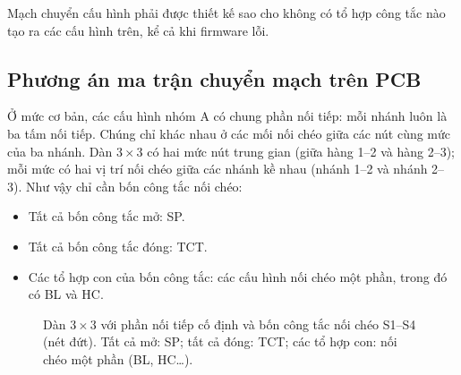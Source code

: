 Mạch chuyển cấu hình phải được thiết kế sao cho không có tổ hợp công tắc nào tạo ra các cấu hình trên, kể cả khi firmware lỗi.

\subsection{Phương án ma trận chuyển mạch trên PCB}
\label{sec:pcb}

Ở mức cơ bản, các cấu hình nhóm A có chung phần nối tiếp: mỗi nhánh luôn là ba tấm nối tiếp. Chúng chỉ khác nhau ở các mối nối chéo giữa các nút cùng mức của ba nhánh. Dàn \(3\times3\) có hai mức nút trung gian (giữa hàng 1--2 và hàng 2--3); mỗi mức có hai vị trí nối chéo giữa các nhánh kề nhau (nhánh 1--2 và nhánh 2--3). Như vậy chỉ cần bốn công tắc nối chéo:

\begin{itemize}
    \item Tất cả bốn công tắc mở: SP.
    \item Tất cả bốn công tắc đóng: TCT.
    \item Các tổ hợp con của bốn công tắc: các cấu hình nối chéo một phần, trong đó có BL và HC.
\end{itemize}

\begin{figure}[H]
\centering
{}
\caption{Dàn \(3\times3\) với phần nối tiếp cố định và bốn công tắc nối chéo S1--S4 (nét đứt). Tất cả mở: SP; tất cả đóng: TCT; các tổ hợp con: nối chéo một phần (BL, HC\dots).}
\label{fig:tie-switches}
\end{figure}

